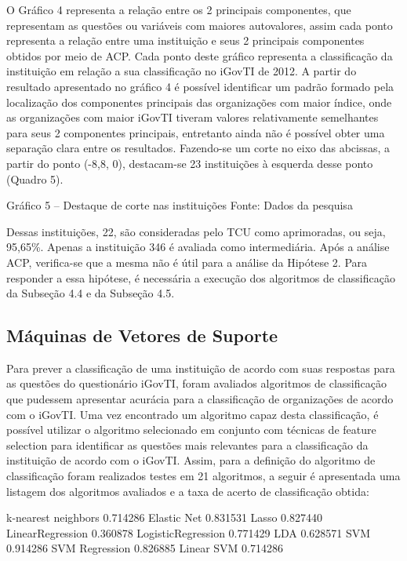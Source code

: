 O Gráfico 4 representa a relação entre os 2 principais componentes, que representam as questões ou variáveis com maiores autovalores, assim cada ponto representa a relação entre uma instituição e seus 2 principais componentes obtidos por meio de ACP. Cada ponto deste gráfico representa a classificação da instituição em relação a sua classificação no iGovTI de 2012. A partir do resultado apresentado no gráfico 4 é possível identificar um padrão formado pela localização dos componentes principais das organizações com maior índice, onde as organizações com maior iGovTI tiveram valores relativamente semelhantes para seus 2 componentes principais, entretanto ainda não é possível obter uma separação clara entre os resultados. Fazendo-se um corte no eixo das abcissas, a partir do ponto (-8,8, 0), destacam-se 23 instituições à esquerda desse ponto (Quadro 5). 

Gráfico 5 – Destaque de corte nas instituições 
Fonte: Dados da pesquisa

Dessas instituições, 22, são consideradas pelo TCU como aprimoradas, ou seja, 95,65\%. Apenas a instituição 346 é avaliada como intermediária.
Após a análise ACP, verifica-se que a mesma não é útil para a análise da Hipótese 2. Para responder a essa hipótese, é necessária a execução dos algoritmos de classificação da Subseção 4.4 e da Subseção 4.5.

\subsection{Máquinas de Vetores de Suporte}

Para prever a classificação de uma instituição de acordo com suas respostas para as questões do questionário iGovTI, foram avaliados algoritmos de classificação que pudessem apresentar acurácia para a classificação de organizações de acordo com o iGovTI. Uma vez encontrado um algoritmo capaz desta classificação, é possível utilizar o algoritmo selecionado em conjunto com técnicas de feature selection para identificar as questões mais relevantes para a classificação da instituição de acordo com o iGovTI.
Assim, para a definição do algoritmo de classificação foram realizados testes em 21 algoritmos, a seguir é apresentada uma listagem dos algoritmos avaliados e a taxa de acerto de classificação obtida: 

k-nearest neighbors \cite{fukunaga1975branch}	0.714286
Elastic Net \cite{zou2005regularization}	0.831531
Lasso \cite{tibshirani1996regression}	0.827440
LinearRegression \cite{draper2014applied}	0.360878
LogisticRegression \cite{hosmer2013applied}	0.771429
LDA \cite{martinez2001pca}	0.628571
SVM \cite{hearst1998support}	0.914286
SVM Regression \cite{smola2004tutorial}	0.826885
Linear SVM \cite{fan2008liblinear}	0.714286

